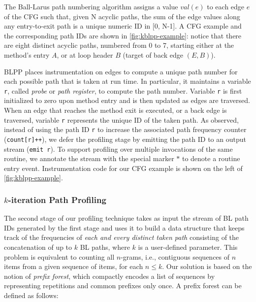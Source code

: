 \ifauthorea{\newline}{}
\noindent The Ball-Larus path numbering algorithm
assigns a value $val(e)$ to each edge $e$ of the CFG such that, given N acyclic paths, the sum of the edge values along any entry-to-exit path is a unique numeric ID in [0, N-1]. A CFG example and the corresponding path IDs are shown in \myfigure\ref{fig:kblpp-example}: notice that there are eight distinct acyclic paths, numbered from 0 to 7, starting either at the method's entry $A$, or at loop header $B$ (target of back edge $(E,B)$).

BLPP places instrumentation on edges to compute a unique path number for each possible path that is taken at run time. In particular, it maintains a variable {\tt r}, called {\em probe} or {\em path register}, to compute the path number. Variable {\tt r} is first initialized to zero upon method entry and is then updated as edges are traversed. When an edge that reaches the method exit is executed, or a back edge is traversed, variable {\tt r} represents the unique ID of the taken path. As observed, instead of using the path ID {\tt r} to increase the associated path frequency counter ({\tt count[r]++}), we defer the profiling stage by emitting the path ID to an output stream ({\tt emit r}). To support profiling over multiple invocations of the same routine, we annotate the stream with the special marker $*$ to denote a routine entry event. Instrumentation code for our CFG example is shown on the left of \myfigure\ref{fig:kblpp-example}.

\subsubsection*{$k$-iteration Path Profiling}
The second stage of our profiling technique takes as input the stream of BL path IDs generated by the first stage and uses it to build a data structure that keeps track of the frequencies of {\em each and every distinct taken path} consisting of the concatenation of up to $k$ BL paths, where $k$ is a user-defined parameter. This problem is equivalent to counting all $n$-grams, i.e., contiguous sequences of $n$ items from a given sequence of items, for each $n\le k$. Our solution is based on the notion of {\em prefix forest}, which compactly encodes a list of sequences by representing repetitions and common prefixes only once. A prefix forest can be defined as follows:

